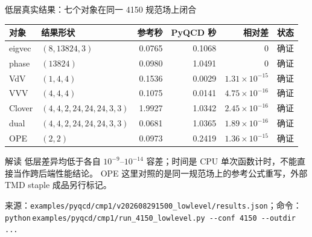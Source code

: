 \documentclass[UTF8,aspectratio=169,11pt]{ctexbeamer}
\newcommand{\source}[1]{\vspace{0.05em}\par{\raggedright\scriptsize\color{muted}来源：#1\par}}
\newcommand{\codepath}[1]{\nolinkurl{#1}}
\newcommand{\verified}{\textcolor{evidence}{确证}}
\begin{document}
\begin{frame}[t]{低层真实结果：七个对象在同一 4150 规范场上闭合}
  \footnotesize
  \setlength{\tabcolsep}{4pt}
  \renewcommand{\arraystretch}{1.10}
  \begin{tabularx}{0.96\textwidth}{@{}L Y r r r l@{}}
    \toprule
    对象 & 结果形状 & 参考秒 & PyQCD 秒 & 相对差 & 状态\\
    \midrule
    eigvec & $(8,13824,3)$ & 0.0765 & 0.1068 & $0$ & \verified\\
    phase & $(13824)$ & 0.0980 & 1.0491 & $0$ & \verified\\
    VdV & $(1,4,4)$ & 0.1536 & 0.0029 & $1.31\times10^{-15}$ & \verified\\
    VVV & $(4,4,4)$ & 0.1075 & 0.0141 & $4.75\times10^{-16}$ & \verified\\
    Clover & $(4,4,2,24,24,24,3,3)$ & 1.9927 & 1.0342 & $2.45\times10^{-16}$ & \verified\\
    dual & $(4,4,2,24,24,24,3,3)$ & 0.0681 & 1.0365 & $1.89\times10^{-16}$ & \verified\\
    OPE & $(2,2)$ & 0.0973 & 0.2419 & $1.36\times10^{-15}$ & \verified\\
    \bottomrule
  \end{tabularx}
  \vfill
  \begin{block}{解读}
    低层差异均低于各自 $10^{-9}$--$10^{-14}$ 容差；时间是 CPU 单次函数计时，不能直接当作跨后端性能结论。
    OPE 这里对照的是同一规范场上的参考公式重写，外部 TMD staple 成品另行标记。
  \end{block}
  \source{\codepath{examples/pyqcd/cmp1/v202608291500_lowlevel/results.json}；命令：\texttt{python}\,\codepath{examples/pyqcd/cmp1/run_4150_lowlevel.py --conf 4150 --outdir ...}}
\end{frame}
\end{document}
